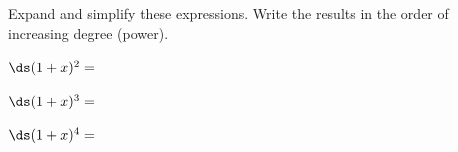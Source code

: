 Expand and simplify these expressions.  Write the results in the order of increasing degree (power).

\medskip \noindent $\ds (1+x)^2=$

\vspace{30mm}

\medskip \noindent $\ds (1+x)^3=$

\vspace{30mm}

\medskip \noindent $\ds (1+x)^4=$
